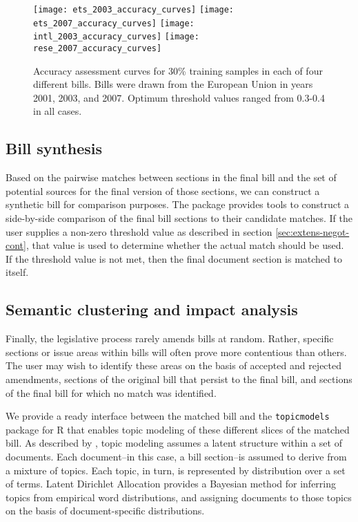 \documentclass[11pt]{article}
\begin{document}
\begin{figure}[ht]
  \centering
  \texttt{[image: ets\_2003\_accuracy\_curves]}
  \texttt{[image: ets\_2007\_accuracy\_curves]}
  \texttt{[image: intl\_2003\_accuracy\_curves]}
  \texttt{[image: rese\_2007\_accuracy\_curves]}
  \caption{Accuracy assessment curves for 30\% training samples in
    each of four different bills. Bills were drawn from the European
    Union in years 2001, 2003, and 2007. Optimum threshold values
    ranged from 0.3-0.4 in all cases.}
  \label{fig:bill-accuracy-curves}
\end{figure}

\subsection{Bill synthesis}
\label{sec:bill-synthesis}

Based on the pairwise matches between sections in the final bill and
the set of potential sources for the final version of those sections,
we can construct a synthetic bill for comparison purposes. The package
provides tools to construct a side-by-side comparison of the final
bill sections to their candidate matches. If the user supplies a
non-zero threshold value as described in section
\ref{sec:extens-negot-cont}, that
value is used to determine whether the actual match
should be used. If the threshold value is not met, then the final
document section is matched to itself. 


\subsection{Semantic clustering and impact analysis}
\label{sec:semant-clust-impact}

Finally, the legislative process rarely amends bills at
random. Rather, specific sections or issue areas within bills will
often prove more contentious than others. The user may wish to
identify these areas on the basis of accepted and rejected amendments,
sections of the original bill that persist to the final bill, and
sections of the final bill for which no match was identified. 

We provide a ready interface between the matched bill and the
\texttt{topicmodels} package for R that enables topic modeling of
these different slices of the matched bill. As described by
\cite{blei2003latent}, topic modeling assumes a latent
structure within a set of documents. Each document--in this case, a
bill section--is assumed to derive from a mixture of topics. Each
topic, in turn, is represented by distribution over a
set of terms. Latent Dirichlet Allocation provides a Bayesian method
for inferring topics from empirical word distributions, and assigning
documents to those topics on the basis of document-specific
distributions. 
\end{document}
